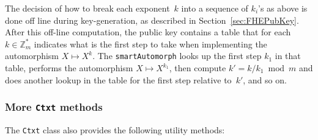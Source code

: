 \documentclass[14pt]{extarticle}
\newcommand{\secref}[1]{Section~\protect\ref{sec:#1}}
\newcommand{\Z}{\mathbb{Z}}
\begin{document}
The decision of how to break each exponent~$k$ into a sequence of
$k_i$'s as above is done off line during key-generation, as described
in \secref{FHEPubKey}. After this off-line computation, the public
key contains a table that for each $k\in\Z_m^*$ indicates what is the
first step to take when implementing the automorphism $X\mapsto X^k$.
The \texttt{smartAutomorph} looks up the first step $k_1$ in that
table, performs the automorphism $X\mapsto X^{k_1}$, then compute
$k' = k/k_1 \bmod m$ and does another lookup in the table for the
first step relative to~$k'$, and so on.

\subsubsection{More \texttt{Ctxt} methods} \label{sec:moreCtxtMethods}
The \texttt{Ctxt} class also provides the following utility methods:
\end{document}
